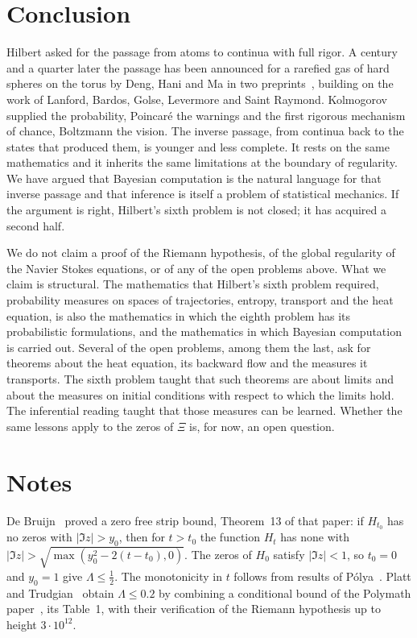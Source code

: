 \section{Conclusion}

Hilbert asked for the passage from atoms to continua with full rigor. A century and a quarter later the passage has been announced for a rarefied gas of hard spheres on the torus by Deng, Hani and Ma in two preprints~\cite{denghanima2024,denghanima2025}, building on the work of Lanford, Bardos, Golse, Levermore and Saint Raymond. Kolmogorov supplied the probability, Poincar\'e the warnings and the first rigorous mechanism of chance, Boltzmann the vision. The inverse passage, from continua back to the states that produced them, is younger and less complete. It rests on the same mathematics and it inherits the same limitations at the boundary of regularity. We have argued that Bayesian computation is the natural language for that inverse passage and that inference is itself a problem of statistical mechanics. If the argument is right, Hilbert's sixth problem is not closed; it has acquired a second half.

We do not claim a proof of the Riemann hypothesis, of the global regularity of the Navier Stokes equations, or of any of the open problems above. What we claim is structural. The mathematics that Hilbert's sixth problem required, probability measures on spaces of trajectories, entropy, transport and the heat equation, is also the mathematics in which the eighth problem has its probabilistic formulations, and the mathematics in which Bayesian computation is carried out. Several of the open problems, among them the last, ask for theorems about the heat equation, its backward flow and the measures it transports. The sixth problem taught that such theorems are about limits and about the measures on initial conditions with respect to which the limits hold. The inferential reading taught that those measures can be learned. Whether the same lessons apply to the zeros of $\Xi$ is, for now, an open question.



\section*{Notes}

De Bruijn~\cite{debruijn1950} proved a zero free strip bound, Theorem~13 of that paper: if $H_{t_0}$ has no zeros with $|\Im z|>y_0$, then for $t>t_0$ the function $H_t$ has none with $|\Im z|>\sqrt{\max(y_0^2-2(t-t_0),0)}$. The zeros of $H_0$ satisfy $|\Im z|<1$, so $t_0 = 0$ and $y_0 = 1$ give $\Lambda\leq\frac12$. The monotonicity in $t$ follows from results of P\'olya~\cite{polya1927}. Platt and Trudgian~\cite{platttrudgian2021} obtain $\Lambda\leq0.2$ by combining a conditional bound of the Polymath paper~\cite{polymath2019}, its Table~1, with their verification of the Riemann hypothesis up to height $3\cdot10^{12}$.
